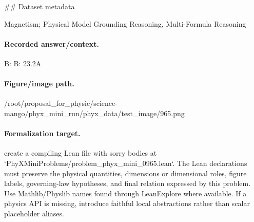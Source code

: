 \#\# Dataset metadata

Magnetism; Physical Model Grounding Reasoning, Multi-Formula Reasoning

\paragraph{Recorded answer/context.}
B: B: 23.2A

\paragraph{Figure/image path.}
/root/proposal\_for\_physic/science-mango/phyx\_mini\_run/phyx\_data/test\_image/965.png

\paragraph{Formalization target.}
create a compiling Lean file with sorry bodies at `PhyXMiniProblems/problem\_phyx\_mini\_0965.lean`. The Lean declarations must preserve the physical quantities, dimensions or dimensional roles, figure labels, governing-law hypotheses, and final relation expressed by this problem.
Use Mathlib/Physlib names found through LeanExplore where available. If a physics API is missing, introduce faithful local abstractions rather than scalar placeholder aliases.

